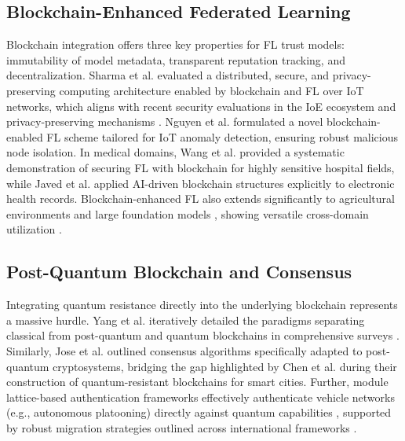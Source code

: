 \documentclass[journal, 10pt, twocolumn]{IEEEtran}
\begin{document}
\subsection{Blockchain-Enhanced Federated Learning}
Blockchain integration offers three key properties for FL trust models: immutability of model metadata, transparent reputation tracking, and decentralization. Sharma et al. \cite{sharma2022} evaluated a distributed, secure, and privacy-preserving computing architecture enabled by blockchain and FL over IoT networks, which aligns with recent security evaluations in the IoE ecosystem \cite{eren2025} and privacy-preserving mechanisms \cite{sameera2024, moore2024}. Nguyen et al. \cite{nguyen2025} formulated a novel blockchain-enabled FL scheme tailored for IoT anomaly detection, ensuring robust malicious node isolation. In medical domains, Wang et al. \cite{wang2026} provided a systematic demonstration of securing FL with blockchain for highly sensitive hospital fields, while Javed et al. \cite{javed2025} applied AI-driven blockchain structures explicitly to electronic health records. Blockchain-enhanced FL also extends significantly to agricultural environments \cite{marzougui2025} and large foundation models \cite{rong2025}, showing versatile cross-domain utilization \cite{bentley2014, anon_crdownload}.

\subsection{Post-Quantum Blockchain and Consensus}
Integrating quantum resistance directly into the underlying blockchain represents a massive hurdle. Yang et al. iteratively detailed the paradigms separating classical from post-quantum and quantum blockchains in comprehensive surveys \cite{yang2024_survey1, yang2024_survey2}. Similarly, Jose et al. \cite{jose2021} outlined consensus algorithms specifically adapted to post-quantum cryptosystems, bridging the gap highlighted by Chen et al. \cite{chen2021} during their construction of quantum-resistant blockchains for smart cities. Further, module lattice-based authentication frameworks effectively authenticate vehicle networks (e.g., autonomous platooning) directly against quantum capabilities \cite{chaudhary2024}, supported by robust migration strategies outlined across international frameworks \cite{elbizri2026}.
\end{document}
